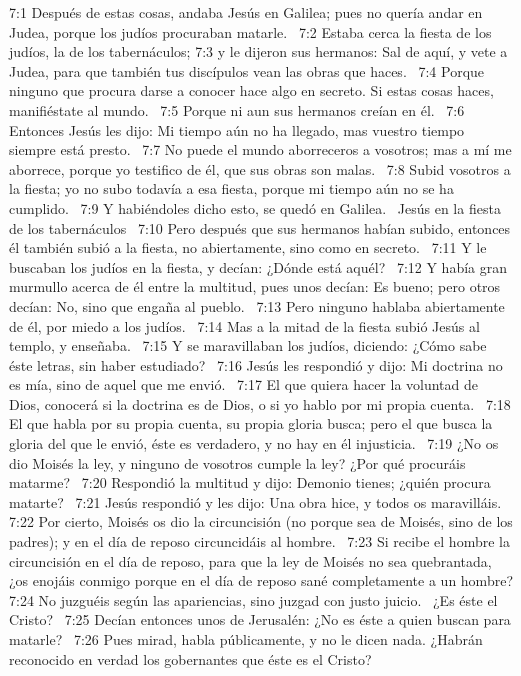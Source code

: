 7:1 Después de estas cosas, andaba Jesús en Galilea; pues no quería andar en Judea, porque los judíos procuraban matarle.  
7:2 Estaba cerca la fiesta de los judíos, la de los tabernáculos; 
7:3 y le dijeron sus hermanos: Sal de aquí, y vete a Judea, para que también tus discípulos vean las obras que haces.  
7:4 Porque ninguno que procura darse a conocer hace algo en secreto. Si estas cosas haces, manifiéstate al mundo.  
7:5 Porque ni aun sus hermanos creían en él.  
7:6 Entonces Jesús les dijo: Mi tiempo aún no ha llegado, mas vuestro tiempo siempre está presto.  
7:7 No puede el mundo aborreceros a vosotros; mas a mí me aborrece, porque yo testifico de él, que sus obras son malas.  
7:8 Subid vosotros a la fiesta; yo no subo todavía a esa fiesta, porque mi tiempo aún no se ha cumplido.  
7:9 Y habiéndoles dicho esto, se quedó en Galilea.  
Jesús en la fiesta de los tabernáculos  
7:10 Pero después que sus hermanos habían subido, entonces él también subió a la fiesta, no abiertamente, sino como en secreto.  
7:11 Y le buscaban los judíos en la fiesta, y decían: ¿Dónde está aquél?  
7:12 Y había gran murmullo acerca de él entre la multitud, pues unos decían: Es bueno; pero otros decían: No, sino que engaña al pueblo.  
7:13 Pero ninguno hablaba abiertamente de él, por miedo a los judíos.  
7:14 Mas a la mitad de la fiesta subió Jesús al templo, y enseñaba.  
7:15 Y se maravillaban los judíos, diciendo: ¿Cómo sabe éste letras, sin haber estudiado?  
7:16 Jesús les respondió y dijo: Mi doctrina no es mía, sino de aquel que me envió.  
7:17 El que quiera hacer la voluntad de Dios, conocerá si la doctrina es de Dios, o si yo hablo por mi propia cuenta.  
7:18 El que habla por su propia cuenta, su propia gloria busca; pero el que busca la gloria del que le envió, éste es verdadero, y no hay en él injusticia.  
7:19 ¿No os dio Moisés la ley, y ninguno de vosotros cumple la ley? ¿Por qué procuráis matarme?  
7:20 Respondió la multitud y dijo: Demonio tienes; ¿quién procura matarte?  
7:21 Jesús respondió y les dijo: Una obra hice, y todos os maravilláis.  
7:22 Por cierto, Moisés os dio la circuncisión (no porque sea de Moisés, sino de los padres); y en el día de reposo circuncidáis al hombre.  
7:23 Si recibe el hombre la circuncisión en el día de reposo, para que la ley de Moisés no sea quebrantada, ¿os enojáis conmigo porque en el día de reposo sané completamente a un hombre? 
7:24 No juzguéis según las apariencias, sino juzgad con justo juicio.  
¿Es éste el Cristo?  
7:25 Decían entonces unos de Jerusalén: ¿No es éste a quien buscan para matarle?  
7:26 Pues mirad, habla públicamente, y no le dicen nada. ¿Habrán reconocido en verdad los gobernantes que éste es el Cristo?  

